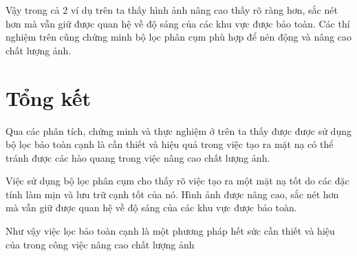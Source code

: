 \documentclass[12pt,letterpaper]{report}
\begin{document}
Vậy trong cả 2 ví dụ trên ta thấy hình ảnh nâng cao thấy rõ ràng hơn, sắc nét hơn mà vẫn giữ được quan hệ về độ sáng của các khu vực được bảo toàn. Các thí nghiệm trên cũng chứng minh bộ lọc phân cụm phù hợp để nén động và nâng cao chất lượng ảnh.
	
\section{Tổng kết}

Qua các phân tích, chứng minh và thực nghiệm ở trên ta thấy được được sử dụng bộ lọc bảo toàn cạnh là cần thiết và hiệu quả trong việc tạo ra mặt nạ có thể tránh được các hào quang trong việc nâng cao chất lượng ảnh.

Việc sử dụng bộ lọc phân cụm cho thấy rõ việc tạo ra một mặt nạ tốt do các đặc tính làm mịn và lưu trữ cạnh tốt của nó. Hình ảnh được nâng cao, sắc nét hơn mà vẫn giữ được quan hệ về độ sáng của các khu vực được bảo toàn.


Như vậy việc lọc bảo toàn cạnh là một phương pháp hết sức cần thiết và hiệu của trong công việc nâng cao chất lượng ảnh

    
\end{document}

